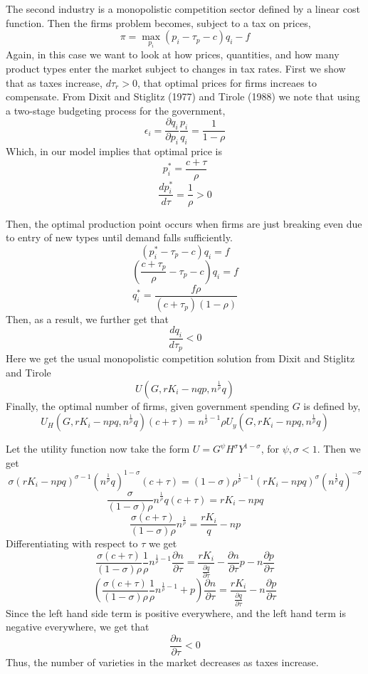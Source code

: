 \documentclass{article}
\begin{document}
The second industry is a monopolistic competition sector defined by a linear cost function. Then the firms problem becomes, subject to a tax on prices,
$$\pi = \max_{p_{i}} (p_{i}-\tau_{p}-c)q_{i}-f$$
Again, in this case we want to look at how prices, quantities, and how many product types enter the market subject to changes in tax rates. First we show that as taxes increase, $d\tau_{r} > 0$, that optimal prices for firms increaes to compensate. From Dixit and Stiglitz (1977) and Tirole (1988) we note that using a two-stage budgeting process for the government,
$$\epsilon_{i} = \frac{\partial q_{i}}{\partial p_{i}}\frac{p_{i}}{q_{i}} = \frac{1}{1-\rho}$$
Which, in our model implies that optimal price is
$$p_{i}^{*} = \frac{c+\tau}{\rho}$$
$$\frac{dp_{i}^{*}}{d\tau} = \frac{1}{\rho} > 0$$

Then, the optimal production point occurs when firms are just breaking even due to entry of new types until demand falls sufficiently.
$$(p_{i}^{*}-\tau_{p}-c)q_{i} = f$$
$$(\frac{c+\tau_{p}}{\rho}-\tau_{p}-c)q_{i} = f$$
$$q_{i}^{*} = \frac{f\rho}{(c+\tau_{p})(1-\rho)}$$
Then, as a result, we further get that
$$\frac{dq_{i}}{d\tau_{p}} < 0$$
Here we get the usual monopolistic competition solution from Dixit and Stiglitz and Tirole
$$U(G,rK_{i}-nqp,n^{\frac{1}{\rho}}q)$$
Finally, the optimal number of firms, given government spending $G$ is defined by,
$$U_{H}(G, rK_{i}-npq, n^{\frac{1}{\rho}}q)(c+\tau)=n^{\frac{1}{\rho}-1}\rho U_{y}(G, rK_{i}-npq, n^{\frac{1}{\rho}}q)$$

Let the utility function now take the form $U = G^{\psi}H^{\sigma}Y^{1-\sigma}$, for $\psi, \sigma < 1 $. Then we get
$$\sigma (rK_{i}-npq)^{\sigma-1}(n^{\frac{1}{\rho}}q)^{1-\sigma}(c+\tau) = (1-\sigma)\rho^{\frac{1}{\rho}-1}(rK_{i}-npq)^{\sigma}(n^{\frac{1}{\rho}}q)^{-\sigma}$$
$$\frac{\sigma}{(1-\sigma)\rho} n^{\frac{1}{\rho}}q (c+\tau) = rK_{i}-npq $$
$$\frac{\sigma(c+\tau)}{(1-\sigma)\rho} n^{\frac{1}{\rho}}  = \frac{rK_{i}}{q}-np $$
Differentiating with respect to $\tau$ we get
$$\frac{\sigma(c+\tau)}{(1-\sigma)\rho} \frac{1}{\rho}n^{\frac{1}{\rho}-1}\frac{\partial n}{\partial \tau} = \frac{rK_{i}}{\frac{\partial q}{\partial \tau}} - \frac{\partial n}{\partial \tau}p-n\frac{\partial p}{\partial \tau}$$
$$(\frac{\sigma(c+\tau)}{(1-\sigma)\rho} \frac{1}{\rho}n^{\frac{1}{\rho}-1}+p)\frac{\partial n}{\partial \tau} = \frac{rK_{i}}{\frac{\partial q}{\partial \tau}}-n\frac{\partial p}{\partial \tau}$$
Since the left hand side term is positive everywhere, and the left hand term is negative everywhere, we get that
$$\frac{\partial n}{\partial \tau} < 0$$
Thus, the number of varieties in the market decreases as taxes increase.
\end{document}
